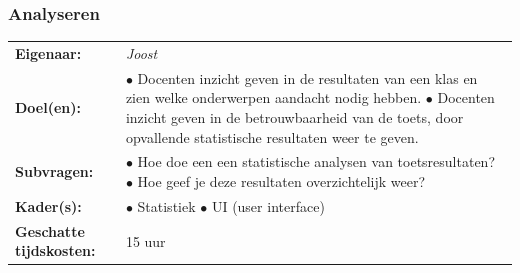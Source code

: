 \documentclass[12pt]{article}
\begin{document}
\pagebreak
\subsubsection{Analyseren}
\begin{tabularx}{}{@{}ll}
    \textbf{Eigenaar: } & \textit{Joost} \\
    \textbf{Doel(en): } & 
        \makecell[tl]{
            $\bullet$ Docenten inzicht geven in de resultaten van een klas en zien welke \\onderwerpen aandacht nodig hebben.\\
            $\bullet$ Docenten inzicht geven in de betrouwbaarheid van de toets, door opvallende \\ statistische resultaten weer te geven.\\
        } \\
    \textbf{Subvragen: } & 
        \makecell[tl]{
            $\bullet$ Hoe doe een een statistische analysen van toetsresultaten? \\
            $\bullet$ Hoe geef je deze resultaten overzichtelijk weer? \\
        }\\
    \textbf{Kader(s): } & 
        \makecell[tl]{
            $\bullet$ Statistiek \\
            $\bullet$ UI (user interface) \\
        }\\
    \parbox[t]{3cm}{\raggedright \textbf{Geschatte  tijdskosten:} } & 15 uur \\
\end{tabularx}
\end{document}
